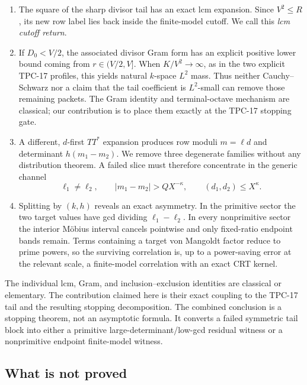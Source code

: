 \begin{enumerate}[label=\textup{(\roman*)}]
\item The square of the sharp divisor tail has an exact lcm expansion.
Since $V^2\le R$, its new row label lies back inside the finite-model
cutoff.  We call this \emph{lcm cutoff return}.

\item If $D_0<V/2$, the associated divisor Gram form has an explicit
positive lower bound coming from $r\in(V/2,V]$.  When
$K/V^2\to\infty$, as in the two
explicit TPC-17 profiles, this yields natural $k$-space $L^2$ mass.
Thus neither Cauchy--Schwarz nor a claim that the tail coefficient is
$L^2$-small can remove those remaining packets.  The Gram identity and
terminal-octave mechanism are classical;
our contribution is to place them exactly at the TPC-17 stopping gate.

\item A different, $d$-first $TT^*$ expansion produces row moduli
$m=\ell d$ and determinant $h(m_1-m_2)$.  We remove three degenerate
families without any distribution theorem.  A failed slice must
therefore concentrate in the generic channel
\[
 \ell_1\ne\ell_2,\qquad
 |m_1-m_2|>QX^{-\kappa},\qquad
 (d_1,d_2)\le X^\kappa.
\]

\item Splitting by $(k,h)$ reveals an exact asymmetry.  In the primitive
sector the two target values have gcd dividing $\ell_1-\ell_2$.  In
every nonprimitive sector the interior M\"obius interval cancels
pointwise and only fixed-ratio endpoint bands remain.  Terms containing
a target von Mangoldt factor reduce to prime powers, so the surviving
correlation is, up to a power-saving error at the relevant scale, a
finite-model correlation with an exact CRT kernel.
\end{enumerate}

The individual lcm, Gram, and inclusion--exclusion identities are
classical or elementary.  The contribution claimed here is their exact
coupling to the TPC-17 tail and the resulting stopping decomposition.
The combined conclusion is a stopping theorem, not an asymptotic
formula.  It converts a failed symmetric tail block into either a
primitive large-determinant/low-gcd residual witness or a nonprimitive
endpoint finite-model witness.

\subsection{What is not proved}

